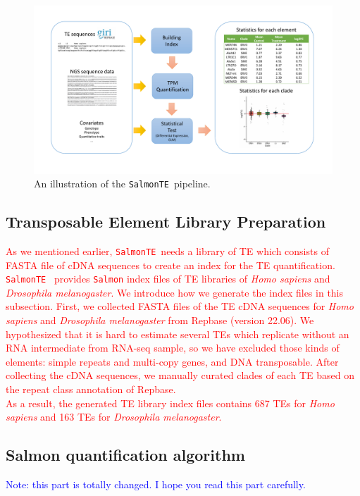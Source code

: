 \documentclass[wsdraft]{ws-procs11x85}
\newcommand{\SalmonTE}{\texttt{SalmonTE}}
\begin{document}
\begin{figure}[h]
\centerline{
\includegraphics[width=14cm]{fig1.pdf}
}
\caption{An illustration of the \SalmonTE~pipeline.}
\label{aba:fig1}
\end{figure}

\subsection{Transposable Element Library Preparation}
\textcolor{red}{
As we mentioned earlier, \SalmonTE~needs a library of TE which consists of FASTA file of cDNA sequences to create an index for the TE quantification. \SalmonTE~ provides \texttt{Salmon} index files of TE libraries of \textit{Homo sapiens} and \textit{Drosophila melanogaster}. We introduce how we generate the index files in this subsection. First, we collected FASTA files of the TE cDNA sequences for \textit{Homo sapiens} and \textit{Drosophila melanogaster} from Repbase (version 22.06)\cite{repbase}.
We hypothesized that it is hard to estimate several TEs which replicate without an RNA intermediate from RNA-seq sample, so we have excluded those kinds of elements: simple repeats and multi-copy genes, and DNA transposable. After collecting the cDNA sequences, we manually curated clades of each TE based on the repeat class annotation of Repbase. \\
As a result, the generated TE library index files contains 687 TEs for \textit{Homo sapiens} and 163 TEs for \textit{Drosophila melanogaster}.}

\subsection{Salmon quantification algorithm}

\textcolor{blue}{Note: this part is totally changed. I hope you read this part carefully.}
\end{document}
